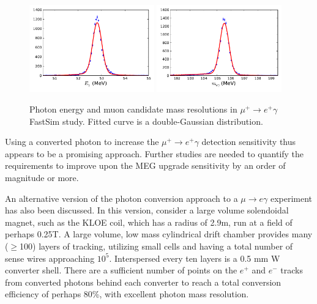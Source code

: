 \begin{figure}[htbp]
   \centering
   \includegraphics[width=0.48\textwidth]{ChargedLeptons/Figures/muegamma-gamma-resolution.pdf} 
   \includegraphics[width=0.48\textwidth]{ChargedLeptons/Figures/muegamma-mumass-resolution.pdf} 
   \caption{Photon energy and muon candidate mass resolutions in 
   $\mu^+\to e^+\gamma$ FastSim study. Fitted curve is a double-Gaussian 
   distribution.}
   \label{fig:muegamma-resolutions}
\end{figure}

Using a converted photon to increase the $\mu^+\to e^+\gamma$ detection sensitivity
thus appears to be a promising approach. Further studies are needed to quantify the requirements to improve upon the MEG upgrade sensitivity by an order of magnitude or more.

An alternative version of the photon conversion approach to a $\mu \to e \gamma$ experiment has also been discussed. In this version, consider a large volume solendoidal magnet, such as the KLOE coil, which has a radius of 2.9m, run at a field of perhaps 0.25T. A large volume, low mass cylindrical drift chamber provides many ($\ge$100) layers of tracking, utilizing small cells and having a total number of sense wires approaching $10^5$. Interspersed every ten layers is a 0.5 mm W converter shell. There are a sufficient number of points on the $e^+$ and $e^-$ tracks from converted photons behind each converter to reach a total conversion efficiency of perhaps 80\%, with excellent photon mass resolution. 




